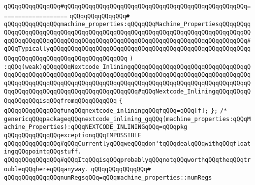 \verb|qQQqqQQqqQQqqQQq#qQQqqQQqqQQqqQQqqQQqqQQqqQQqqQQqqQQqqQQqqQQqqQQqqQQq===================|\newline
\verb|qQQqqQQqqQQqqQQq#|\newline
\verb|qQQqqQQqqQQqqQQqmachine_properties:qQQqqQQqMachine_PropertiesqQQqqQQqqQQqqQQqqQQqqQQqqQQqqQQqqQQqqQQqqQQqqQQqqQQqqQQqqQQqqQQqqQQqqQQqqQQqqQQqqQQqqQQqqQQqqQQqqQQqqQQqqQQqqQQqqQQqqQQqqQQqqQQqqQQqqQQqqQQqqQQqqQQq#qQQqTypicallyqQQqqQQqqQQqqQQqqQQqqQQqqQQqqQQqqQQqqQQqqQQqqQQqqQQqqQQqqQQqqQQqqQQqqQQqqQQqqQQqqQQqqQQqqQQq|\newline
\verb|)|\newline
\verb|:qQQq(weak)qQQqqQQqNextcode_InliningqQQqqQQqqQQqqQQqqQQqqQQqqQQqqQQqqQQqqQQqqQQqqQQqqQQqqQQqqQQqqQQqqQQqqQQqqQQqqQQqqQQqqQQqqQQqqQQqqQQqqQQqqQQqqQQqqQQqqQQqqQQqqQQqqQQqqQQqqQQqqQQqqQQqqQQqqQQqqQQqqQQqqQQqqQQqqQQqqQQqqQQqqQQqqQQqqQQqqQQqqQQqqQQqqQQq#qQQqNextcode_InliningqQQqqQQqqQQqqQQqqQQqisqQQqfromqQQqqQQqqQQq|\newline
\verb|{|\newline
\verb|qQQqqQQqqQQqqQQqfunqQQqnextcode_inliningqQQqfqQQq=qQQq[f];|\newline
\newline
\verb|};|\newline
\newline
\newline
\verb|/*|\newline
\verb|genericqQQqpackageqQQqnextcode_inlining_gqQQq(machine_properties:qQQqMachine_Properties):qQQqNEXTCODE_INLININGqQQq=qQQqpkg|\newline
\newline
\verb|qQQqqQQqqQQqqQQqexceptionqQQqIMPOSSIBLE|\newline
\newline
\verb|qQQqqQQqqQQqqQQq#qQQqCurrentlyqQQqweqQQqdon'tqQQqdealqQQqwithqQQqfloatingqQQqpointqQQqstuff.|\newline
\verb|qQQqqQQqqQQqqQQq#qQQqItqQQqisqQQqprobablyqQQqnotqQQqworthqQQqtheqQQqtroubleqQQqhereqQQqanyway.|\newline
\verb|qQQqqQQqqQQqqQQq#|\newline
\verb|qQQqqQQqqQQqqQQqnumRegsqQQq=qQQqmachine_properties::numRegs|\newline
